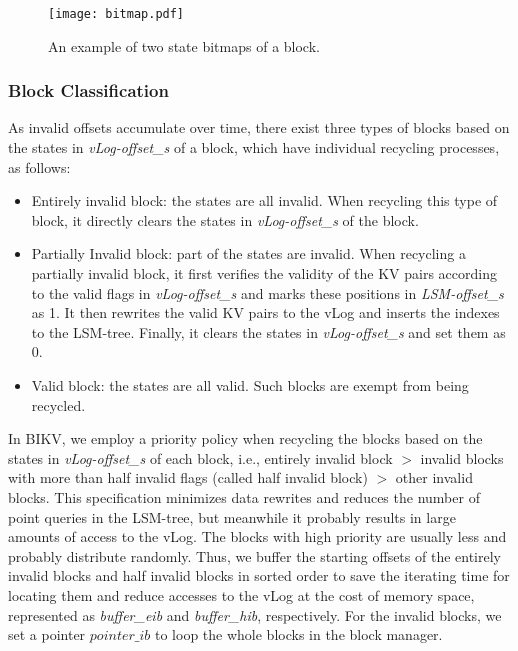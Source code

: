 \documentclass[sigconf]{acmart}
\begin{document}
\begin{figure}[!t]
	\setlength{\abovecaptionskip}{0.cm}	
	\setlength{\belowcaptionskip}{-0.cm}
	\centerline{\texttt{[image: bitmap.pdf]}}
	\caption{An example of two state bitmaps of a block.}
	\label{fig:iblock}
\end{figure}

\subsubsection{Block Classification}
As invalid offsets accumulate over time, there exist three types of blocks based on the states in \textit{vLog-offset\_s} of a block, which have individual recycling processes, as follows: 
\begin{itemize}
	\item Entirely invalid block: the states are all invalid. When recycling this type of block, it directly clears the states in \textit{vLog-offset\_s} of the block.
	\item Partially Invalid block: part of the states are invalid. When recycling a partially invalid block, it first verifies the validity of the KV pairs according to the valid flags in \textit{vLog-offset\_s} and marks these positions in \textit{LSM-offset\_s} as 1. It then rewrites the valid KV pairs to the vLog and inserts the indexes to the LSM-tree. Finally, it clears the states in \textit{vLog-offset\_s} and set them as 0.
	\item Valid block: the states are all valid. Such blocks are exempt from being recycled.
\end{itemize}

In BIKV, we employ a priority policy when recycling the blocks based on the states in \textit{vLog-offset\_s} of each block, i.e., entirely invalid block $>$ invalid blocks with more than half invalid flags (called half invalid block) $>$ other invalid blocks. This specification minimizes data rewrites and reduces the number of point queries in the LSM-tree, but meanwhile it probably results in large amounts of access to the vLog. The blocks with high priority are usually less and probably distribute randomly. Thus, we buffer the starting offsets of the entirely invalid blocks and half invalid blocks in sorted order to save the iterating time for locating them and reduce accesses to the vLog at the cost of memory space, represented as \textit{buffer\_eib} and \textit{buffer\_hib}, respectively. For the invalid blocks, we set a pointer $pointer\_ib$ to loop the whole blocks in the block manager.
\end{document}
